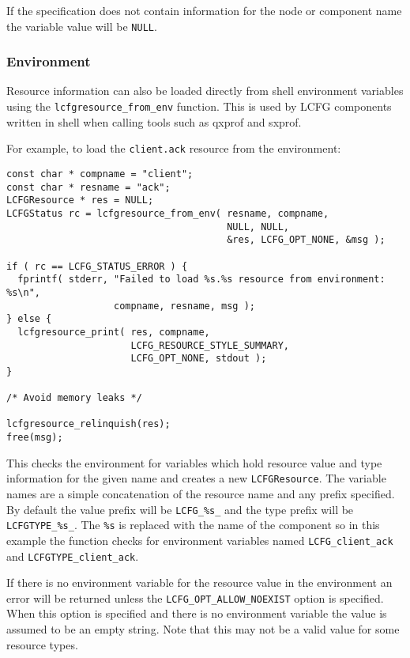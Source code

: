 \documentclass[11pt,a4paper,titlepage]{article}
\begin{document}
If the specification does not contain information for the node or
component name the variable value will be \texttt{NULL}.

\subsubsection{Environment}
\label{subsec:res_env}

Resource information can also be loaded directly from shell
environment variables using the \texttt{lcfgresource\_from\_env}
function. This is used by LCFG components written in shell when
calling tools such as qxprof and sxprof.

For example, to load the \texttt{client.ack} resource from the environment:

\begin{verbatim}
const char * compname = "client";
const char * resname = "ack";
LCFGResource * res = NULL;
LCFGStatus rc = lcfgresource_from_env( resname, compname,
                                       NULL, NULL,
                                       &res, LCFG_OPT_NONE, &msg );

if ( rc == LCFG_STATUS_ERROR ) {
  fprintf( stderr, "Failed to load %s.%s resource from environment: %s\n",
                   compname, resname, msg );
} else {
  lcfgresource_print( res, compname,
                      LCFG_RESOURCE_STYLE_SUMMARY,
                      LCFG_OPT_NONE, stdout );
}

/* Avoid memory leaks */

lcfgresource_relinquish(res);
free(msg);
\end{verbatim}

This checks the environment for variables which hold resource value
and type information for the given name and creates a new
\texttt{LCFGResource}. The variable names are a simple concatenation
of the resource name and any prefix specified.  By default the value
prefix will be \texttt{LCFG\_\%s\_} and the type prefix will be
\texttt{LCFGTYPE\_\%s\_}. The \texttt{\%s} is replaced with the name
of the component so in this example the function checks for
environment variables named \texttt{LCFG\_client\_ack} and
\texttt{LCFGTYPE\_client\_ack}.

If there is no environment variable for the resource value in the
environment an error will be returned unless the
\texttt{LCFG\_OPT\_ALLOW\_NOEXIST} option is specified. When this
option is specified and there is no environment variable the value is
assumed to be an empty string. Note that this may not be a valid value
for some resource types.
\end{document}
